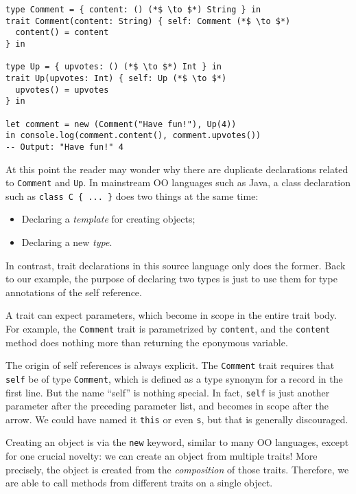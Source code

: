 \begin{lstlisting}
type Comment = { content: () (*$ \to $*) String } in
trait Comment(content: String) { self: Comment (*$ \to $*)
  content() = content
} in

type Up = { upvotes: () (*$ \to $*) Int } in
trait Up(upvotes: Int) { self: Up (*$ \to $*)
  upvotes() = upvotes
} in

let comment = new (Comment("Have fun!"), Up(4))
in console.log(comment.content(), comment.upvotes())
-- Output: "Have fun!" 4
\end{lstlisting}

At this point the reader may wonder why there are duplicate declarations related
to \lstinline$Comment$ and \lstinline$Up$. In mainstream OO languages such as
Java, a class declaration such as \lstinline$class C { ... }$ does two things at
the same time:

\begin{itemize}
\item Declaring a \emph{template} for creating objects;
\item Declaring a new \emph{type}.
\end{itemize}

\noindent In contrast, trait declarations in this source language only does the
former. Back to our example, the purpose of declaring two types is just to use
them for type annotations of the self reference.

A trait can expect parameters, which become in scope in the entire trait body.
For example, the \lstinline$Comment$ trait is parametrized by
\lstinline$content$, and the \lstinline$content$ method does nothing more than
returning the eponymous variable.

The origin of self references is always explicit. The \lstinline$Comment$ trait
requires that \lstinline$self$ be of type \lstinline$Comment$, which is defined
as a type synonym for a record in the first line. But the name ``self'' is
nothing special. In fact, \lstinline$self$ is just another parameter after the
preceding parameter list, and becomes in scope after the arrow. We could have
named it \lstinline$this$ or even \lstinline$s$, but that is generally
discouraged.

Creating an object is via the \lstinline$new$ keyword, similar to many OO
languages, except for one crucial novelty: we can create an object from multiple
traits! More precisely, the object is created from the \emph{composition} of
those traits. Therefore, we are able to call methods from different traits on a
single object.

